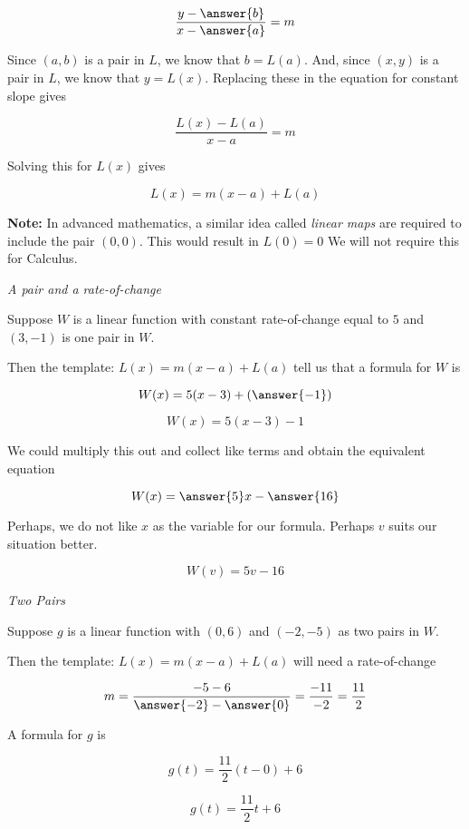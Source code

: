 \documentclass{ximera}
\begin{document}
\[  \frac{y - \answer{b}}{x-\answer{a}} = m \]

Since $(a, b)$ is a pair in $L$, we know that $b = L(a)$.  And, since $(x, y)$ is a pair in $L$, we know that $y = L(x)$.  Replacing these in the equation for constant slope gives


\[  \frac{L(x) - L(a)}{x-a} = m \]

Solving this for $L(x)$ gives

\[  L(x) = m (x-a) + L(a)     \]



\textbf{Note:} In advanced mathematics, a similar idea called \textit{linear maps} are required to include the pair $(0,0)$.  This would result in $L(0) = 0$  We will not require this for Calculus.




\begin{example} \textit{A pair and a rate-of-change}


Suppose $W$ is a linear function with constant rate-of-change equal to $5$ and $(3, -1)$ is one pair in $W$.

Then the template: $L(x) = m (x-a) + L(a)$ tell us that a formula for $W$ is 


\[  W(x) = 5 (x-3) + (\answer{-1})     \]


\[  W(x) = 5 (x-3) - 1     \]

We could multiply this out and collect like terms and obtain the equivalent equation


\[  W(x) = \answer{5}x - \answer{16}   \]


Perhaps, we do not like $x$ as the variable for our formula.  Perhaps $v$ suits our situation better.

\[  W(v) = 5v - 16   \]

\end{example}









\begin{example} \textit{Two Pairs}


Suppose $g$ is a linear function with $(0, 6)$ and $(-2, -5)$ as two pairs in $W$.

Then the template: $L(x) = m (x-a) + L(a)$ will need a rate-of-change



\[  m = \frac{-5 - 6}{\answer{-2} - \answer{0}} = \frac{-11}{-2} = \frac{11}{2}  \]

A formula for $g$ is


\[  g(t) = \frac{11}{2} (t-0) + 6     \]


\[  g(t) = \frac{11}{2} t + 6    \]



\end{example}
\end{document}
